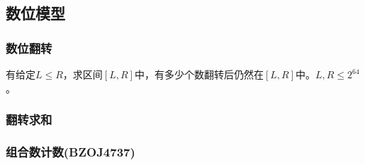 \subsection{数位模型}
\subsubsection{数位翻转}
有给定$L\le R$，求区间$[L,R]$中，有多少个数翻转后仍然在$[L,R]$中。$L, R\le 2^{64}$。
\subsubsection{翻转求和}
\subsubsection{组合数计数(BZOJ4737)}
\fi
